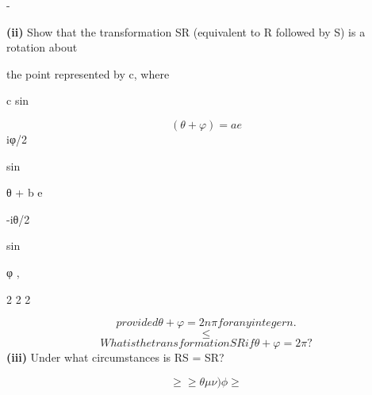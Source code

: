 \documentclass[12pt]{article}
\begin{document}
\begin{flushleft}
-\par
\textbf{(ii)} Show that the transformation SR (equivalent to R followed by S) is a rotation about\par
the point represented by c, where\par
c sin\par
\[(θ + φ) = a e\]
iφ/2\par
sin\par
θ + b e\par
-iθ/2\par
sin\par
φ ,\par
2 2 2\par
\[provided θ + φ = 2n\pi for any integer n.\]
\[\leq\]
\[What is the transformation SR if θ + φ = 2\pi?\]
\textbf{(iii)} Under what circumstances is RS = SR?\par
\[\geq\geq\theta\mu\nu) \phi \geq\]
\end{flushleft}
\end{document}

